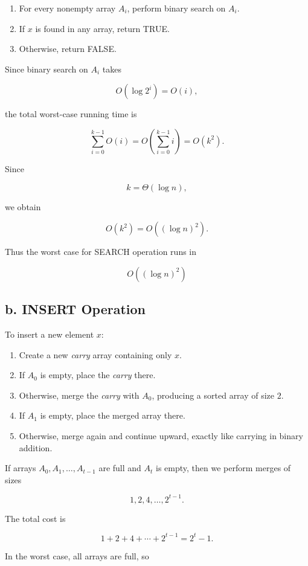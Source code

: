 \documentclass[12pt]{article}
\begin{document}
\begin{enumerate}
    \item For every nonempty array \(A_i\),
    perform binary search on \(A_i\).
    \item If \(x\) is found in any array, return TRUE.
    \item Otherwise, return FALSE.
\end{enumerate}

Since binary search on \(A_i\) takes

\[
O(\log 2^i) = O(i),
\]

the total worst-case running time is

\[
\sum_{i=0}^{k-1} O(i)
=
O\left(\sum_{i=0}^{k-1} i\right)
=
O(k^2).
\]

Since

\[
k = \Theta(\log n),
\]

we obtain

\[
O(k^2) = O((\log n)^2).
\]

Thus the worst case for SEARCH operation runs in

\[
\boxed{O((\log n)^2)}
\]

\subsection*{b. INSERT Operation}

To insert a new element \(x\):

\begin{enumerate}
    \item Create a new \textit{carry} array containing only \(x\).
    \item If \(A_0\) is empty, place the \textit{carry} there.
    \item Otherwise, merge the \textit{carry} with \(A_0\), producing a sorted array of size \(2\).
    \item If \(A_1\) is empty, place the merged array there.
    \item Otherwise, merge again and continue upward, exactly like carrying in binary addition.
\end{enumerate}

If arrays \(A_0, A_1, \dots, A_{t-1}\) are full and \(A_t\) is empty, then we perform merges of sizes

\[
1,2,4,\dots,2^{t-1}.
\]

The total cost is

\[
1 + 2 + 4 + \cdots + 2^{t-1}
=
2^t - 1.
\]

In the worst case, all arrays are full, so
\end{document}
